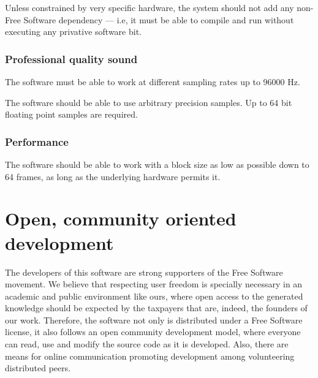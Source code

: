 \begin{requirement}\label{req:free}
Unless constrained by very specific hardware, the system should not
add any non-Free Software dependency --- i.e, it must be able to
compile and run without executing any privative software bit. 
\end{requirement}

\subsubsection{Professional quality sound}

\begin{requirement}
\label{req:iter1-begin2}
The software must be able to work at different sampling rates up to
96000 Hz.
\end{requirement}

\begin{requirement}
\label{req:iter1-end2}
The software should be able to use arbitrary precision samples. Up to
64 bit floating point samples are required.
\end{requirement}

\subsubsection{Performance}

\begin{requirement}
  \label{req:latency} The software should be able to work with a block size as low as
  possible down to 64 frames, as long as the underlying hardware
  permits it.
\end{requirement}

\section{Open, community oriented development}

The developers of this software are strong supporters of the Free
Software movement. We believe that respecting user freedom is
specially necessary in an academic and public environment like ours,
where open access to the generated knowledge should be expected by the
taxpayers that are, indeed, the founders of our work. Therefore, the
software not only is distributed under a Free Software license, it
also follows an open community development model, where everyone can
read, use and modify the source code as it is developed. Also, there
are means for online communication promoting development among
volunteering distributed peers.


